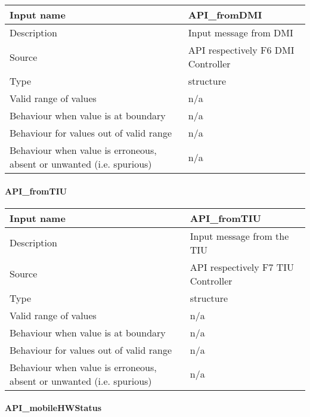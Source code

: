 \begin{longtable}{p{}p{}}
\toprule
Input name				& API\_fromDMI \\
\midrule
Description				& Input message from DMI \\
\midrule
Source					& API respectively F6 DMI Controller\\ 
\midrule
Type					& structure \\
\midrule
Valid range of values	& n/a \\
\midrule
Behaviour when value is at boundary	& n/a \\
\midrule
Behaviour for values out of valid range	& n/a \\
\midrule
Behaviour when value is erroneous, absent or unwanted (i.e. spurious) & n/a \\
\bottomrule
\end{longtable}

\paragraph{API\_fromTIU}

\begin{longtable}{p{}p{}}
\toprule
Input name				& API\_fromTIU \\
\midrule
Description				& Input message from the TIU \\
\midrule
Source					& API respectively F7 TIU Controller \\ 
\midrule
Type					& structure \\
\midrule
Valid range of values	& n/a \\
\midrule
Behaviour when value is at boundary	& n/a \\
\midrule
Behaviour for values out of valid range	& n/a \\
\midrule
Behaviour when value is erroneous, absent or unwanted (i.e. spurious) & n/a \\
\bottomrule
\end{longtable}

\paragraph{API\_mobileHWStatus}


